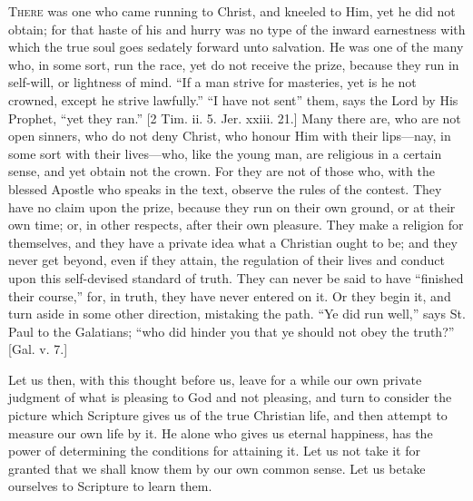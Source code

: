 T\textsc{here} was one who came running to Christ, and kneeled to Him, yet
he did not obtain; for that haste of his and hurry was no type of the
inward earnestness with which the true soul goes sedately forward unto
salvation. He was one of the many who, in some sort, run the race, yet
do not receive the prize, because they run in self-will, or lightness
of mind. ``If a man strive for masteries, yet is he not crowned,
except he strive lawfully.'' ``I have not sent'' them,
says the Lord by His Prophet, ``yet they ran.'' [2 Tim. ii. 5.
Jer. xxiii. 21.] Many there are, who are not open sinners, who do not
deny Christ, who honour Him with their lips—nay, in some sort with
their lives—who, like the young man, are religious in a certain
sense, and yet obtain not the crown. For they are not of those who,
with the blessed Apostle who speaks in the text, observe the rules of
the contest. They have no claim upon the prize, because they run on
their own ground, or at their own time; or, in other respects, after
their own pleasure. They make a religion for themselves, and they have
a private idea what a Christian ought to be; and they never get
beyond, even if they attain, the regulation of their lives and conduct
upon this self-devised standard of truth. They can never be said to
have ``finished their course,'' for, in truth, they have never
entered on it. Or they begin it, and turn aside in some other
direction, mistaking the path. ``Ye did run well,'' says St.
Paul to the Galatians; ``who did hinder you that ye should not
obey the truth?'' [Gal. v. 7.]

Let us then, with this thought before us, leave for a while our own
private judgment of what is pleasing to God and not pleasing, and turn
to consider the picture which Scripture gives us of the true Christian
life, and then attempt to measure our own life by it. He alone who
gives us eternal happiness, has the power of determining the
conditions for attaining it. Let us not take it for granted that we
shall know them by our own common sense. Let us betake ourselves to
Scripture to learn them.

